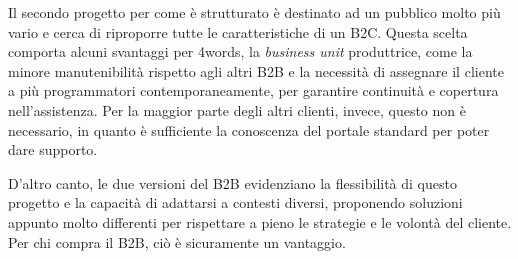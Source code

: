 Il secondo progetto per come è strutturato è destinato ad un pubblico molto più vario e cerca di riproporre tutte le caratteristiche di un B2C. Questa scelta comporta alcuni svantaggi per 4words, la \textit{business unit} produttrice, come la minore manutenibilità rispetto agli altri B2B e la necessità di assegnare il cliente a più programmatori contemporaneamente, per garantire continuità e copertura nell'assistenza. Per la maggior parte degli altri clienti, invece, questo non è necessario, in quanto è sufficiente la conoscenza del portale standard per poter dare supporto.

D'altro canto, le due versioni del B2B evidenziano la flessibilità di questo progetto e la capacità di adattarsi a contesti diversi, proponendo soluzioni appunto molto differenti per rispettare a pieno le strategie e le volontà del cliente. Per chi compra il B2B, ciò è sicuramente un vantaggio.